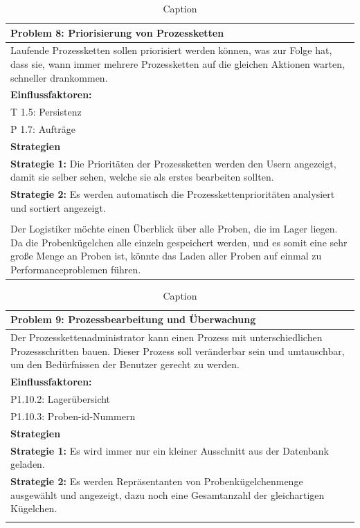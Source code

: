 \documentclass[enabledeprecatedfontcommands,fontsize=12pt,paper=a4,twoside]{scrartcl}
\begin{document}
\begin{table}[H]
    \centering
    \begin{tabular}{|p{15cm}|}
    \hline
          \textbf{Problem 8:} Priorisierung von Prozessketten
          \\ \hline
          Laufende Prozessketten sollen priorisiert werden können, was zur Folge hat, dass sie, wann immer mehrere Prozessketten auf die gleichen Aktionen warten, schneller drankommen. 
          \\ \hline
          \textbf{Einflussfaktoren: } \\
          T 1.5: Persistenz \\
          P 1.7: Aufträge \\
          \hline
          \textbf{Strategien} \\ \hline
          \textbf{Strategie 1:} Die Prioritäten der Prozessketten werden den Usern angezeigt, damit sie selber sehen, welche sie als erstes bearbeiten sollten. \\
          \textbf{Strategie 2:} Es werden automatisch die Prozesskettenprioritäten analysiert und sortiert angezeigt. \\
          \\ \hline

          Der Logistiker möchte einen Überblick über alle Proben, die im Lager liegen. Da die Probenkügelchen alle einzeln gespeichert werden, und es somit eine sehr große Menge an Proben ist, könnte das Laden aller Proben auf einmal zu Performanceproblemen führen.

    \end{tabular}
    \caption{Caption}
    \label{tab:my_label}
\end{table}

\begin{table}[H]
    \centering
    \begin{tabular}{|p{15cm}|}
    \hline
          \textbf{Problem 9:} Prozessbearbeitung und Überwachung
          \\ \hline
          Der Prozesskettenadministrator kann einen Prozess mit unterschiedlichen Prozessschritten bauen. Dieser Prozess soll veränderbar sein und umtauschbar, um den Bedürfnissen der Benutzer gerecht zu werden.

          \\ \hline
          \textbf{Einflussfaktoren: } \\
          P1.10.2: Lagerübersicht \\
	      P1.10.3: Proben-id-Nummern \\
          \hline
          \textbf{Strategien} \\ \hline
          \textbf{Strategie 1:} Es wird immer nur ein kleiner Ausschnitt aus der Datenbank geladen. \\
         \textbf{Strategie 2:} Es werden Repräsentanten von Probenkügelchenmenge ausgewählt und angezeigt, dazu noch eine Gesamtanzahl der gleichartigen Kügelchen. \\
          \\ \hline
    \end{tabular}
    \caption{Caption}
    \label{tab:my_label}
\end{table}
\end{document}
